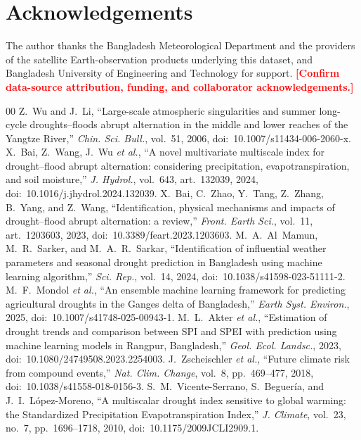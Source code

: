 \documentclass[conference]{IEEEtran}
\newcommand{\todo}[1]{\textbf{\textcolor{red}{[#1]}}}
\begin{document}
\section*{Acknowledgements}
The author thanks the Bangladesh Meteorological Department and the providers of the satellite
Earth-observation products underlying this dataset, and Bangladesh University of Engineering and
Technology for support. \todo{Confirm data-source attribution, funding, and collaborator
acknowledgements.}

\begin{thebibliography}{00}
 Z.~Wu and J.~Li, ``Large-scale atmospheric singularities and summer long-cycle
droughts--floods abrupt alternation in the middle and lower reaches of the Yangtze River,'' \emph{Chin.
Sci. Bull.}, vol.~51, 2006, doi:~10.1007/s11434-006-2060-x.
 X.~Bai, Z.~Wang, J.~Wu \emph{et al.}, ``A novel multivariate multiscale index for
drought--flood abrupt alternation: considering precipitation, evapotranspiration, and soil moisture,''
\emph{J. Hydrol.}, vol.~643, art.~132039, 2024, doi:~10.1016/j.jhydrol.2024.132039.
 X.~Bai, C.~Zhao, Y.~Tang, Z.~Zhang, B.~Yang, and Z.~Wang, ``Identification, physical
mechanisms and impacts of drought--flood abrupt alternation: a review,'' \emph{Front. Earth Sci.},
vol.~11, art.~1203603, 2023, doi:~10.3389/feart.2023.1203603.
 M.~A.~Al~Mamun, M.~R.~Sarker, and M.~A.~R.~Sarkar, ``Identification of influential
weather parameters and seasonal drought prediction in Bangladesh using machine learning algorithm,''
\emph{Sci. Rep.}, vol.~14, 2024, doi:~10.1038/s41598-023-51111-2.
 M.~F.~Mondol \emph{et al.}, ``An ensemble machine learning framework for predicting
agricultural droughts in the Ganges delta of Bangladesh,'' \emph{Earth Syst. Environ.}, 2025,
doi:~10.1007/s41748-025-00943-1.
 M.~L.~Akter \emph{et al.}, ``Estimation of drought trends and comparison between SPI
and SPEI with prediction using machine learning models in Rangpur, Bangladesh,'' \emph{Geol. Ecol.
Landsc.}, 2023, doi:~10.1080/24749508.2023.2254003.
 J.~Zscheischler \emph{et al.}, ``Future climate risk from compound events,''
\emph{Nat. Clim. Change}, vol.~8, pp.~469--477, 2018, doi:~10.1038/s41558-018-0156-3.
 S.~M.~Vicente-Serrano, S.~Beguer\'ia, and J.~I.~L\'opez-Moreno, ``A multiscalar
drought index sensitive to global warming: the Standardized Precipitation Evapotranspiration Index,''
\emph{J. Climate}, vol.~23, no.~7, pp.~1696--1718, 2010, doi:~10.1175/2009JCLI2909.1.

\end{thebibliography}
\end{document}
